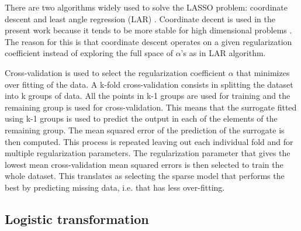 \documentclass[preprint,12pt]{elsarticle}
\begin{document}
There are two algorithms widely used to solve the LASSO problem: coordinate descent \cite{tibshirani1996regression} and least angle regression (LAR) \cite{blatman2011adaptive}. Coordinate decent is used in the present work because it tends to be more stable for high dimensional problems \cite{pedregosa2011scikit}. The reason for this is that coordinate descent operates on a given regularization coefficient instead of exploring the full space of $\alpha$'s as in LAR algorithm.


Cross-validation is used to select the regularization coefficient $\alpha$ that minimizes over fitting of the data. A k-fold cross-validation consists in splitting the dataset into k groups of data. All the points in k-1 groups are used for training and the remaining group is used for cross-validation. This means that the surrogate fitted using k-1 groups is used to predict the output in each of the elements of the remaining group. The mean squared error of the prediction of the surrogate is then computed. This process is repeated leaving out each individual fold and for multiple regularization parameters. The regularization parameter that gives the lowest mean cross-validation mean squared errors is then selected to train the whole dataset. This translates as selecting the sparse model that performs the best by predicting missing data, i.e. that has less over-fitting. 




\subsection{Logistic transformation}
\end{document}
